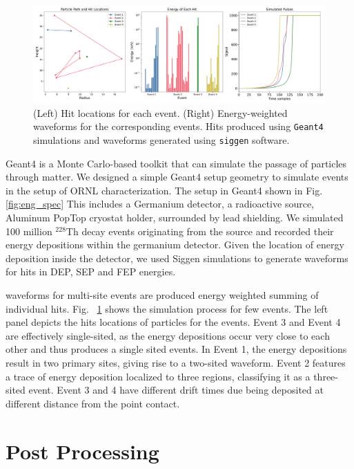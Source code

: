\begin{figure}[htb!]
    \includegraphics[width=0.99\linewidth,trim={1pc 0pc 1pc 0pc},clip]{ch7/figs/hit_sims.pdf}
    \caption{(Left) Hit locations for each event. (Right) Energy-weighted waveforms for the corresponding events. Hits produced using \texttt{Geant4} simulations and waveforms generated using \texttt{siggen} software.}
   \label{fig:eng_dep_sim}
\end{figure}


Geant4 is a Monte Carlo-based toolkit that can simulate the passage of particles through matter. We designed a simple Geant4 setup geometry to simulate events in the setup of ORNL characterization. The setup in  Geant4 shown in Fig. \ref{fig:eng_spec} This includes a Germanium detector, a radioactive source, Aluminum PopTop cryostat holder, surrounded by lead shielding. We simulated 100 million $^{228}$Th decay events originating from the source and recorded their energy depositions within the germanium detector. Given the location of energy deposition inside the detector, we used Siggen simulations to generate waveforms for hits in DEP, SEP and FEP energies.


waveforms for multi-site events are produced energy weighted summing of individual hits. Fig. ~\ref{fig:eng_dep_sim} shows the simulation process for few events. The left panel depicts the hits locations of particles for the events. Event 3 and Event 4 are effectively single-sited, as the energy depositions occur very close to each other and thus produces a single sited events. In Event 1, the energy depositions result in two primary sites, giving rise to a two-sited waveform. Event 2 features a trace of energy deposition localized to three regions, classifying it as a three-sited event. Event 3 and 4 have different drift times due being deposited at different distance from the point contact.

\section{Post Processing}

